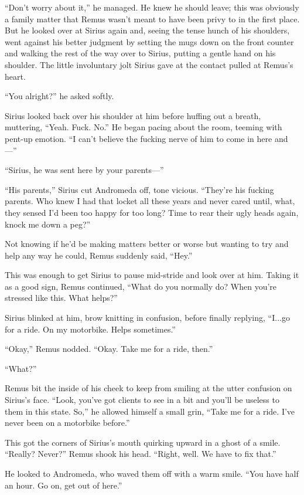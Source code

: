 “Don’t worry about it,” he managed. He knew he should leave; this was obviously a family matter that Remus wasn’t meant to have been privy to in the first place. But he looked over at Sirius again and, seeing the tense hunch of his shoulders, went against his better judgment by setting the mugs down on the front counter and walking the rest of the way over to Sirius, putting a gentle hand on his shoulder. The little involuntary jolt Sirius gave at the contact pulled at Remus’s heart.

“You alright?” he asked softly.

Sirius looked back over his shoulder at him before huffing out a breath, muttering, “Yeah. Fuck. No.” He began pacing about the room, teeming with pent-up emotion. “I can’t believe the fucking nerve of him to come in here and—”

“Sirius, he was sent here by your parents—”

“His parents,” Sirius cut Andromeda off, tone vicious. “They’re his fucking parents. Who knew I had that locket all these years and never cared until, what, they sensed I’d been too happy for too long? Time to rear their ugly heads again, knock me down a peg?”

Not knowing if he’d be making matters better or worse but wanting to try and help any way he could, Remus suddenly said, “Hey.”

This was enough to get Sirius to pause mid-stride and look over at him. Taking it as a good sign, Remus continued, “What do you normally do? When you’re stressed like this. What helps?”

Sirius blinked at him, brow knitting in confusion, before finally replying, “I...go for a ride. On my motorbike. Helps sometimes.”

“Okay,” Remus nodded. “Okay. Take me for a ride, then.”

“What?”

Remus bit the inside of his cheek to keep from smiling at the utter confusion on Sirius’s face. “Look, you’ve got clients to see in a bit and you’ll be useless to them in this state. So,” he allowed himself a small grin, “Take me for a ride. I’ve never been on a motorbike before.”

This got the corners of Sirius’s mouth quirking upward in a ghost of a smile. “Really? Never?” Remus shook his head. “Right, well. We have to fix that.”

He looked to Andromeda, who waved them off with a warm smile. “You have half an hour. Go on, get out of here.”

